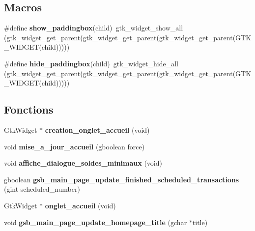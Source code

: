 \subsection*{Macros}
\begin{DoxyCompactItemize}
\item 
\#define {\bf show\_\-paddingbox}(child)~gtk\_\-widget\_\-show\_\-all (gtk\_\-widget\_\-get\_\-parent(gtk\_\-widget\_\-get\_\-parent(gtk\_\-widget\_\-get\_\-parent(GTK\_\-WIDGET(child)))))
\item 
\#define {\bf hide\_\-paddingbox}(child)~gtk\_\-widget\_\-hide\_\-all (gtk\_\-widget\_\-get\_\-parent(gtk\_\-widget\_\-get\_\-parent(gtk\_\-widget\_\-get\_\-parent(GTK\_\-WIDGET(child)))))
\end{DoxyCompactItemize}
\subsection*{Fonctions}
\begin{DoxyCompactItemize}
\item 
GtkWidget $\ast$ {\bf creation\_\-onglet\_\-accueil} (void)
\item 
void {\bf mise\_\-a\_\-jour\_\-accueil} (gboolean force)
\item 
void {\bf affiche\_\-dialogue\_\-soldes\_\-minimaux} (void)
\item 
gboolean {\bf gsb\_\-main\_\-page\_\-update\_\-finished\_\-scheduled\_\-transactions} (gint scheduled\_\-number)
\item 
GtkWidget $\ast$ {\bf onglet\_\-accueil} (void)
\item 
void {\bf gsb\_\-main\_\-page\_\-update\_\-homepage\_\-title} (gchar $\ast$title)
\end{DoxyCompactItemize}
